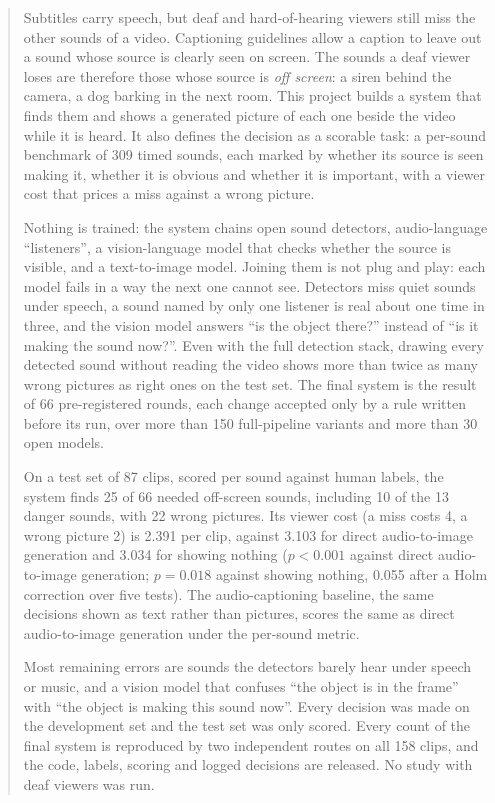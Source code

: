 \begin{abstract}
Subtitles carry speech, but deaf and hard-of-hearing viewers still miss the other sounds of a video. Captioning
guidelines allow a caption to leave out a sound whose source is clearly seen on screen. The sounds a deaf viewer loses are
therefore those whose source is \emph{off screen}: a siren behind the camera, a dog barking in the next room. This project builds a system that
finds them and shows a generated picture of each one beside the video while it is heard. It also defines the
decision as a scorable task: a per-sound benchmark of 309 timed sounds, each marked by whether its source is seen
making it, whether it is obvious and whether it is important, with a viewer cost that prices a miss against a wrong picture.

Nothing is trained: the system chains open sound detectors, audio-language ``listeners'', a vision-language model
that checks whether the source is visible, and a text-to-image model. Joining them is not plug and play: each model
fails in a way the next one cannot see. Detectors miss quiet sounds under speech, a sound named by only one listener is
real about one time in three, and the vision model answers ``is the object there?'' instead of ``is it making the sound
now?''. Even with the full detection stack, drawing every detected sound without reading the video shows more than
twice as many wrong pictures as right ones on the test set. The final system is the result of 66 pre-registered
rounds, each change accepted only by a rule written before its run, over more than 150 full-pipeline variants and
more than 30 open models.

On a test set of 87 clips, scored per sound against human labels, the system finds 25 of 66 needed off-screen sounds,
including 10 of the 13 danger sounds, with 22 wrong pictures. Its viewer cost (a miss costs 4, a wrong picture 2) is
2.391 per clip, against 3.103 for direct audio-to-image generation and 3.034 for showing nothing
($p < 0.001$ against direct audio-to-image generation; $p = 0.018$ against showing nothing, 0.055 after a Holm correction
over five tests). The audio-captioning baseline, the same decisions shown as text rather than pictures, scores the same
as direct audio-to-image generation under the per-sound metric.

Most remaining errors are sounds the detectors barely hear under speech or music, and a vision model that confuses
``the object is in the frame'' with ``the object is making this sound now''. Every decision was made on the
development set and the test set was only scored. Every count of the final system is reproduced by two independent routes on all 158
clips, and the code, labels, scoring and logged decisions are released. No study with deaf viewers was run.
\end{abstract}
